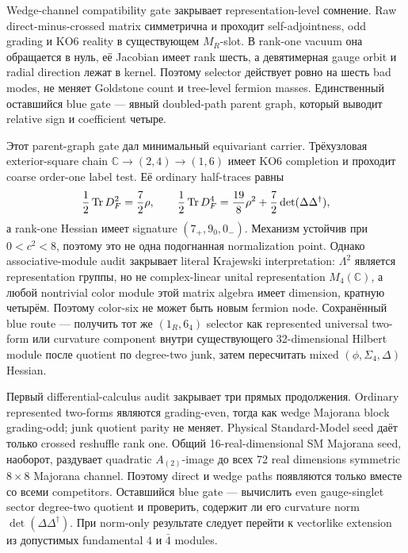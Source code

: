 Wedge-channel compatibility gate закрывает representation-level сомнение.
Raw direct-minus-crossed matrix симметрична и проходит self-adjointness,
odd grading и KO6 reality в существующем \(M_R\)-slot. В rank-one vacuum
она обращается в нуль, её Jacobian имеет rank шесть, а девятимерная gauge
orbit и radial direction лежат в kernel. Поэтому selector действует ровно
на шесть bad modes, не меняет Goldstone count и tree-level fermion masses.
Единственный оставшийся blue gate --- явный doubled-path parent graph,
который выводит relative sign и coefficient четыре.

Этот parent-graph gate дал минимальный equivariant carrier.
Трёхузловая exterior-square chain
\(\mathbb C\to(2,4)\to(1,6)\) имеет KO6 completion и проходит coarse
order-one label test. Её ordinary half-traces равны
\begin{equation}
 \frac12\operatorname{Tr} D_F^2=\frac72\rho,
 \qquad
 \frac12\operatorname{Tr} D_F^4=\frac{19}{8}\rho^2+\frac72
 \det(\Delta\Delta^\dagger),
\end{equation}
а rank-one Hessian имеет signature \((7_+,9_0,0_-)\). Механизм устойчив
при \(0<c^2<8\), поэтому это не одна подогнанная normalization point.
Однако associative-module audit закрывает literal Krajewski interpretation:
\(\Lambda^2\) является representation группы, но не complex-linear unital
representation \(M_4(\mathbb C)\), а любой nontrivial color module этой
matrix algebra имеет dimension, кратную четырём. Поэтому color-six не может
быть новым fermion node. Сохранённый blue route --- получить тот же
\((1_R,6_4)\) selector как represented universal two-form или curvature
component внутри существующего 32-dimensional Hilbert module после quotient
по degree-two junk, затем пересчитать mixed
\((\phi,\Sigma_4,\Delta)\) Hessian.

Первый differential-calculus audit закрывает три прямых продолжения.
Ordinary represented two-forms являются grading-even, тогда как wedge
Majorana block grading-odd; junk quotient parity не меняет. Physical
Standard-Model seed даёт только crossed reshuffle rank one. Общий
16-real-dimensional SM Majorana seed, наоборот, раздувает quadratic
\(A_{(2)}\)-image до всех 72 real dimensions symmetric \(8\times8\)
Majorana channel. Поэтому direct и wedge paths появляются только вместе со
всеми competitors. Оставшийся blue gate --- вычислить even gauge-singlet
sector degree-two quotient и проверить, содержит ли его curvature norm
\(\det(\Delta\Delta^\dagger)\). При norm-only результате следует перейти к
vectorlike extension из допустимых fundamental \(4\) и \(\bar4\) modules.

